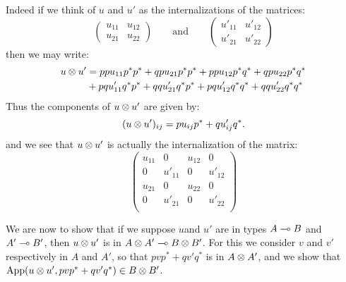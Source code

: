 Indeed if we think of \(u\) and \(u'\) as the internalizations of the
matrices:
\begin{equation*}
  \begin{pmatrix}u_{11}   &  u_{12}\\
                   u_{21}   &  u_{22}
    \end{pmatrix}
  \qquad\text{and}\qquad
    \begin{pmatrix}u'_{11} &  u'_{12}\\
                   u'_{21} &  u'_{22}
    \end{pmatrix}
\end{equation*}
then we may write:
\begin{align*}
    u\otimes u' & = ppu_{11}p^*p^* + qpu_{21}p^*p^* + ppu_{12}p^*q^* + qpu_{22}p^*q^*\\
              & + pqu'_{11}q^*p^* + qqu'_{21}q^*p^* + pqu'_{12}q^*q^* + qqu'_{22}q^*q^*
  \end{align*}
Thus the components of \(u\otimes u'\) are given by:
\begin{equation*}
(u\otimes u')_{ij} = pu_{ij}p^* + qu'_{ij}q^*.
\end{equation*}
and we see that \(u\otimes u'\) is actually the internalization of the
matrix:
\begin{equation*}
    \begin{pmatrix}
      u_{11} &  0       &  u_{12}  &  0       \\
      0      &  u'_{11} &  0       &  u'_{12} \\
      u_{21} &  0       &  u_{22}  &  0       \\
      0      &  u'_{21} &  0       &  u'_{22} \\
    \end{pmatrix}
\end{equation*}

We are now to show that if we suppose \(u\)and \(u'\) are in types
\(A\multimap B\) and \(A'\multimap B'\), then \(u\otimes u'\) is in
\(A\otimes A'\multimap B\otimes B'\). For this we consider \(v\) and \(v'\)
respectively in \(A\) and \(A'\), so that \(pvp^* + qv'q^*\) is in
\(A\otimes A'\), and we show that
\(\mathrm{App}(u\otimes u', pvp^* + qv'q^*)\in B\otimes B'\).

